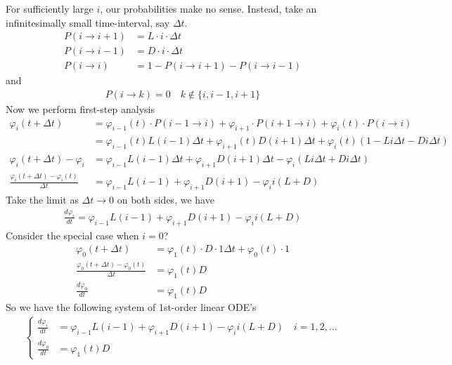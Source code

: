\documentclass[12pt, letterpaper]{article}
\begin{document}
For sufficiently large $i$, our probabilities make no sense. Instead, take an infinitesimally small
time-interval, say $\Delta t$.
\begin{align*}
    P(i\rightarrow i+1) &= L\cdot i\cdot \Delta t \\
    P(i\rightarrow i-1) &= D\cdot i\cdot \Delta t \\
    P(i\rightarrow i) &= 1 - P(i\rightarrow i+1) - P(i\rightarrow i-1)
\end{align*}
and 
\begin{align*}
    P(i\rightarrow k) = 0 \quad k \notin\{i,i-1,i+1\}
\end{align*}
Now we perform first-step analysis
\begin{align*}
    \varphi_i(t+\Delta t) &= \varphi_{i-1}(t)\cdot P(i-1\rightarrow i) + \varphi_{i+1}\cdot P(i+1\rightarrow i) + \varphi_i(t)\cdot P(i\rightarrow i) \\
    &= \varphi_{i-1}(t)L(i-1)\Delta t + \varphi_{i+1}(t)D(i+1)\Delta t + \varphi_i(t)(1-Li\Delta t - Di\Delta t) \\
    \varphi_i(t+\Delta t) - \varphi_i &= \varphi_{i-1} L (i-1)\Delta t + \varphi_{i+1} D(i+1)\Delta t - \varphi_i(Li\Delta t + Di \Delta t) \\
    \frac{\varphi_i(t+\Delta t) - \varphi_i(t)}{\Delta t} &= \varphi_{i-1}L(i-1) + \varphi_{i+1}D(i+1)-\varphi_i i(L+D) 
\end{align*}
Take the limit as $\Delta t \rightarrow 0$ on both sides, we have
\begin{align*}
    \frac{d\varphi_i}{dt} = \varphi_{i-1}L(i-1) + \varphi_{i+1}D(i+1)-\varphi_i i(L+D) 
\end{align*}
Consider the special case when $i = 0$?
\begin{align*}
    \varphi_0(t+\Delta t)&= \varphi_1(t)\cdot D\cdot 1\Delta t + \varphi_0(t)\cdot 1 \\
    \frac{\varphi_0(t+\Delta t) - \varphi_0(t)}{\Delta t} &= \varphi_1(t) D \\
    \frac{d\varphi_0}{dt} &= \varphi_1(t) D 
\end{align*}
So we have the following system of 1st-order linear ODE's
\begin{align*}
    \begin{cases}
        \displaystyle\frac{d\varphi_i}{dt} &= \varphi_{i-1}L(i-1) + \varphi_{i+1}D(i+1)-\varphi_i i(L+D) \quad i = 1,2,\dots \\
        \displaystyle\frac{d\varphi_0}{dt} &= \varphi_1(t) D 
    \end{cases}
\end{align*}
\end{document}
